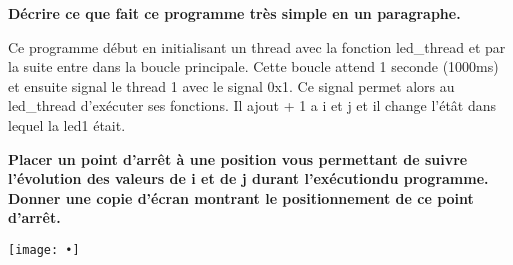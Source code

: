 \documentclass[12pt]{exam}
\begin{document}
\begin{questions}
\question \textbf{Décrire ce que fait ce programme très simple en un paragraphe.}

Ce programme début en initialisant un thread avec la fonction led\_thread et par la suite entre dans la boucle principale. Cette boucle attend 1 seconde (1000ms) et ensuite signal le thread 1 avec le signal 0x1. Ce signal permet alors au led\_thread d'exécuter ses fonctions. Il ajout + 1 a i et j et il change l'étât dans lequel la led1 était.

\question \textbf{Placer un point d’arrêt à une position vous permettant de suivre l’évolution des valeurs de i et de j durant l’exécutiondu programme. Donner une copie d’écran montrant le positionnement de ce point d’arrêt.}

\texttt{[image: •]}

\end{questions}
\end{document}
